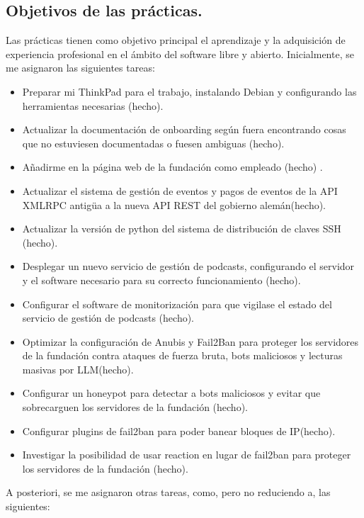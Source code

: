 \subsection{Objetivos de las prácticas.}\label{subsec:objetivos-practicas}
    Las prácticas tienen como objetivo principal el aprendizaje y la adquisición de experiencia profesional en el ámbito del software libre y abierto.
    Inicialmente, se me asignaron las siguientes tareas:
    \begin{itemize}
        \item Preparar mi ThinkPad para el trabajo, instalando Debian y configurando las herramientas necesarias (hecho).
        \item Actualizar la documentación de onboarding según fuera encontrando cosas que no estuviesen documentadas o fuesen ambiguas (hecho).
        \item Añadirme en la página web de la fundación como empleado (hecho) \autocite{wwwFSFE-team}.
        \item Actualizar el sistema de gestión de eventos y pagos de eventos de la API XMLRPC antigüa a la nueva API REST del gobierno alemán(hecho).
        \item Actualizar la versión de python del sistema de distribución de claves SSH (hecho).
        \item Desplegar un nuevo servicio de gestión de podcasts, configurando el servidor y el software necesario para su correcto funcionamiento (hecho).
        \item Configurar el software de monitorización para que vigilase el estado del servicio de gestión de podcasts (hecho).
        \item Optimizar la configuración de Anubis y Fail2Ban para proteger los servidores de la fundación contra ataques de fuerza bruta, bots maliciosos y lecturas masivas por LLM\@ (hecho).
        \item Configurar un honeypot para detectar a bots maliciosos y evitar que sobrecarguen los servidores de la fundación (hecho).
        \item Configurar plugins de fail2ban para poder banear bloques de IP\@ (hecho).
        \item Investigar la posibilidad de usar reaction en lugar de fail2ban para proteger los servidores de la fundación (hecho).
    \end{itemize}
A posteriori, se me asignaron otras tareas, como, pero no reduciendo a, las siguientes:
